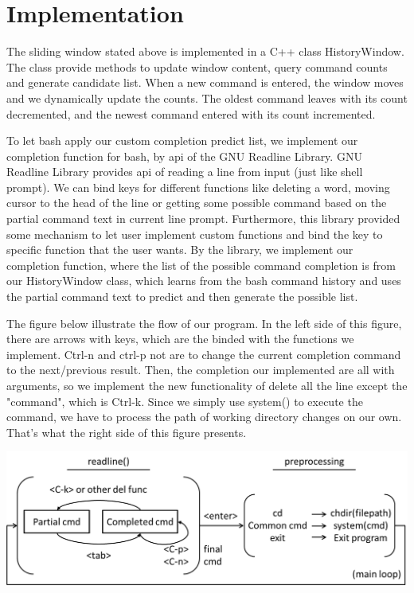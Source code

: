 \documentclass[11pt,a4paper]{article}
\begin{document}
\section*{Implementation}
The sliding window stated above is implemented in a C++ class HistoryWindow. The class provide methods to update window content, query command counts and generate candidate list.
When a new command is entered, the window moves and we dynamically update the counts. The oldest command leaves with its count decremented, and the newest command entered with its count incremented.
\par
To let bash apply our custom completion predict list, 
we implement our completion function for bash, by api of the GNU Readline Library. 
GNU Readline Library provides api of reading a line from input (just like shell prompt).
We can bind keys for different functions like deleting a word, 
moving cursor to the head of the line or getting some possible command 
based on the partial command text in current line prompt. 
Furthermore, this library provided some mechanism to let user implement custom functions 
and bind the key to specific function that the user wants. 
By the library, we implement our completion function, 
where the list of the possible command completion is from our HistoryWindow class, 
which learns from the bash command history and uses the partial command text 
to predict and then generate the possible list.
\par
The figure below illustrate the flow of our program.
In the left side of this figure, there are arrows with keys, 
which are the binded with the functions we implement. 
Ctrl-n and ctrl-p not are to change the current completion command to the next/previous result.
Then, the completion our implemented are all with arguments, so we implement the new functionality of delete
all the line except the "command", which is Ctrl-k.
Since we simply use system() to execute the command, 
we have to process the path of working directory changes on our own.
That's what the right side of this figure presents.
\\
\begin{center}
\includegraphics[scale=0.6]{pic.png}
\end{center}
\end{document}
